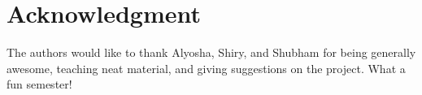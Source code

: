 \documentclass[journal]{IEEEtran}
\begin{document}
%





\section*{Acknowledgment}
The authors would like to thank Alyosha, Shiry, and Shubham for being generally awesome, teaching neat material, and giving suggestions on the project.  What a fun semester!


\ifCLASSOPTIONcaptionsoff
  \newpage
\fi





%
%
%


\end{document}
